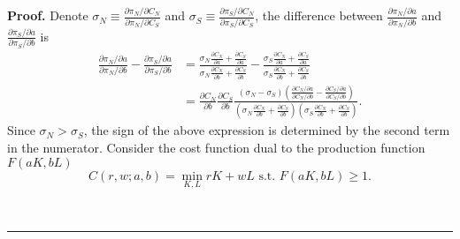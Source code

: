 \documentclass[notitlepage,11pt]{article}%
\newenvironment{proof}[1][Proof]{\noindent \textbf{#1.} }{\  \rule{0.5em}{0.5em}}
\begin{document}
\begin{proof}
Denote $\sigma_{N}\equiv\frac{\partial\pi_{N}/\partial C_{N}}{\partial\pi
_{N}/\partial C_{S}}$ and $\sigma_{S}\equiv\frac{\partial\pi_{S}/\partial
C_{N}}{\partial\pi_{S}/\partial C_{S}}$, the difference between $\frac
{\partial\pi_{N}/\partial a}{\partial\pi_{N}/\partial b}$ and $\frac
{\partial\pi_{S}/\partial a}{\partial\pi_{S}/\partial b}$ is%
\begin{align*}
\frac{\partial\pi_{N}/\partial a}{\partial\pi_{N}/\partial b}-\frac
{\partial\pi_{S}/\partial a}{\partial\pi_{S}/\partial b}  &  =\frac{\sigma
_{N}\frac{\partial C_{N}}{\partial a}+\frac{\partial C_{S}}{\partial a}%
}{\sigma_{N}\frac{\partial C_{N}}{\partial b}+\frac{\partial C_{S}}{\partial
b}}-\frac{\sigma_{S}\frac{\partial C_{N}}{\partial a}+\frac{\partial C_{S}%
}{\partial a}}{\sigma_{S}\frac{\partial C_{N}}{\partial b}+\frac{\partial
C_{S}}{\partial b}}\\
&  =\frac{\partial C_{N}}{\partial b}\frac{\partial C_{S}}{\partial b}%
\frac{\left(  \sigma_{N}-\sigma_{S}\right)  \left(  \frac{\partial
C_{N}/\partial a}{\partial C_{N}/\partial b}-\frac{\partial C_{S}/\partial
a}{\partial C_{S}/\partial b}\right)  }{\left(  \sigma_{N}\frac{\partial
C_{N}}{\partial b}+\frac{\partial C_{S}}{\partial b}\right)  \left(
\sigma_{S}\frac{\partial C_{N}}{\partial b}+\frac{\partial C_{S}}{\partial
b}\right)  }.
\end{align*}
Since $\sigma_{N}>\sigma_{S}$, the sign of the above expression is determined
by the second term in the numerator. Consider the cost function dual to the
production function $F\left(  aK,bL\right)  $%
\[
C\left(  r,w;a,b\right)  =\min_{K,L}rK+wL\text{ s.t. }F\left(  aK,bL\right)
\geq1.
\]



\end{proof}
\end{document}
